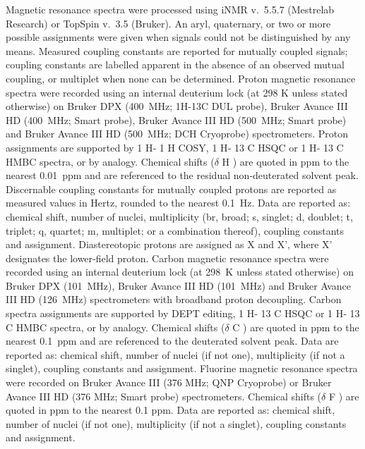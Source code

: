 Magnetic resonance spectra were processed using iNMR v. 5.5.7 (Mestrelab Research) or
TopSpin v. 3.5 (Bruker). An aryl, quaternary, or two or more possible assignments were
given when signals could not be distinguished by any means. Measured coupling
constants are reported for mutually coupled signals; coupling constants are labelled
apparent in the absence of an observed mutual coupling, or multiplet when none can
be determined.
Proton magnetic resonance spectra were recorded using an internal deuterium lock (at
298 K unless stated otherwise) on Bruker DPX (400 MHz; 1H-13C DUL probe), Bruker
Avance III HD (400 MHz; Smart probe), Bruker Avance III HD (500 MHz; Smart probe)
and Bruker Avance III HD (500 MHz; DCH Cryoprobe) spectrometers. Proton assignments
are supported by 1 H‑ 1 H COSY, 1 H‑ 13 C HSQC or 1 H‑ 13 C HMBC spectra, or by analogy.
Chemical shifts ($\delta$ H ) are quoted in ppm to the nearest 0.01 ppm and are referenced to
the residual non‑deuterated solvent peak. Discernable coupling constants for mutually
coupled protons are reported as measured values in Hertz, rounded to the nearest
0.1 Hz. Data are reported as: chemical shift, number of nuclei, multiplicity (br, broad; s,
singlet; d, doublet; t, triplet; q, quartet; m, multiplet; or a combination thereof),
coupling constants and assignment. Diastereotopic protons are assigned as X and X’,
where X’ designates the lower‑field proton.
Carbon magnetic resonance spectra were recorded using an internal deuterium lock (at
298 K unless stated otherwise) on Bruker DPX (101 MHz), Bruker Avance III HD
(101 MHz) and Bruker Avance III HD (126 MHz) spectrometers with broadband proton
decoupling. Carbon spectra assignments are supported by DEPT editing, 1 H‑ 13 C HSQC or
1 H‑ 13 C HMBC spectra, or by analogy. Chemical shifts ($\delta$ C ) are quoted in ppm to the
nearest 0.1 ppm and are referenced to the deuterated solvent peak. Data are reported
as: chemical shift, number of nuclei (if not one), multiplicity (if not a singlet), coupling
constants and assignment.
Fluorine magnetic resonance spectra were recorded on Bruker Avance III (376 MHz;
QNP Cryoprobe) or Bruker Avance III HD (376 MHz; Smart probe) spectrometers.
Chemical shifts ($\delta$ F ) are quoted in ppm to the nearest 0.1 ppm. Data are reported as:
chemical shift, number of nuclei (if not one), multiplicity (if not a singlet), coupling
constants and assignment.




